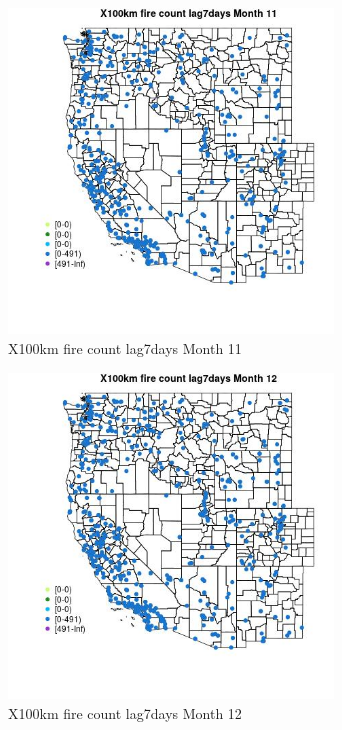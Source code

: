 \begin{figure} 
\centering  
\includegraphics[width=0.77\textwidth]{Code_Outputs/Report_ML_input_PM25_Step4_part_e_de_duplicated_aves_compiled_2019-05-14wNAs_MapObsMo11X100km_fire_count_lag7days.jpg} 
\caption{\label{fig:Report_ML_input_PM25_Step4_part_e_de_duplicated_aves_compiled_2019-05-14wNAsMapObsMo11X100km_fire_count_lag7days}X100km fire count lag7days Month 11} 
\end{figure} 
 

\begin{figure} 
\centering  
\includegraphics[width=0.77\textwidth]{Code_Outputs/Report_ML_input_PM25_Step4_part_e_de_duplicated_aves_compiled_2019-05-14wNAs_MapObsMo12X100km_fire_count_lag7days.jpg} 
\caption{\label{fig:Report_ML_input_PM25_Step4_part_e_de_duplicated_aves_compiled_2019-05-14wNAsMapObsMo12X100km_fire_count_lag7days}X100km fire count lag7days Month 12} 
\end{figure} 
 

